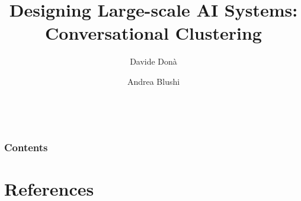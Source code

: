 \documentclass[10pt]{beamer}
\begin{document}
\title{Designing Large-scale AI Systems: Conversational Clustering}
\author[University of Trento]{Davide Donà \and Andrea Blushi}


\date[]{\MonthName\ \number\year}

\frame{\titlepage}
\begin{frame}
\frametitle{Contents}
\tableofcontents
\end{frame}



\section*{References}  
\begin{frame}
\nocite{*}
 
\small{}
\end{frame}
\end{document}

